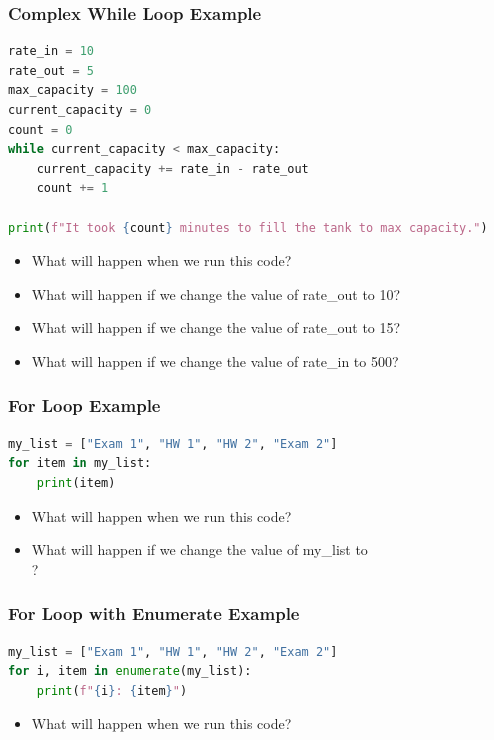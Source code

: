 \documentclass[aspectratio=169]{beamer}
\begin{document}
\begin{frame}[fragile]
    \frametitle{Complex While Loop Example}
    \begin{lstlisting}[language=Python, caption={Complex While Loop}]
rate_in = 10
rate_out = 5
max_capacity = 100
current_capacity = 0
count = 0
while current_capacity < max_capacity:
    current_capacity += rate_in - rate_out
    count += 1

print(f"It took {count} minutes to fill the tank to max capacity.")
    \end{lstlisting}

    \begin{itemize}
        \item What will happen when we run this code?
        \item What will happen if we change the value of rate\_out to 10?
        \item What will happen if we change the value of rate\_out to 15?
        \item What will happen if we change the value of rate\_in to 500?
    \end{itemize}
\end{frame}

\begin{frame}[fragile]
    \frametitle{For Loop Example}
    \begin{lstlisting}[language=Python, caption={For Loop}]
my_list = ["Exam 1", "HW 1", "HW 2", "Exam 2"]
for item in my_list:
    print(item)
    \end{lstlisting}

    \begin{itemize}
        \item What will happen when we run this code?
        \item What will happen if we change the value of my\_list to \[\]?
    \end{itemize}
\end{frame}

\begin{frame}[fragile]
    \frametitle{For Loop with Enumerate Example}
    \begin{lstlisting}[language=Python, caption={For Loop with Enumerate}]
my_list = ["Exam 1", "HW 1", "HW 2", "Exam 2"]
for i, item in enumerate(my_list):
    print(f"{i}: {item}")
    \end{lstlisting}

    \begin{itemize}
        \item What will happen when we run this code?
    \end{itemize}
\end{frame}
\end{document}
